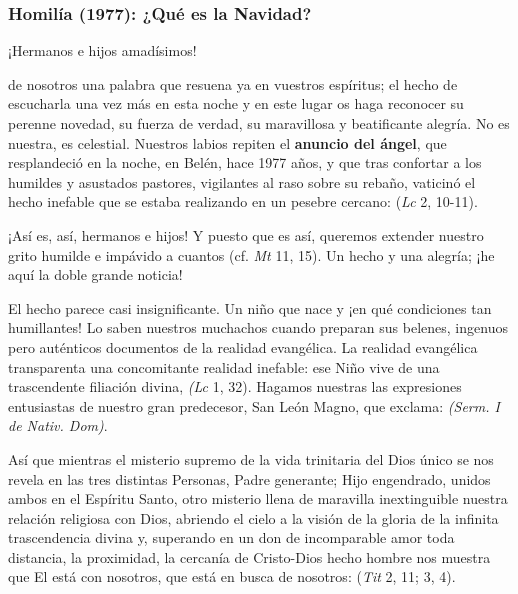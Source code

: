 \subsubsection{Homilía (1977): ¿Qué es la Navidad?}


\begin{body}
	¡Hermanos e hijos amadísimos!
	
	 de nosotros una palabra que resuena ya en vuestros espíritus; el hecho de escucharla una vez más en esta noche y en este lugar os haga reconocer su perenne novedad, su fuerza de verdad, su maravillosa y beatificante alegría. No es nuestra, es celestial. Nuestros labios repiten el \textbf{anuncio del ángel}, que resplandeció en la noche, en Belén, hace 1977 años, y que tras confortar a los humildes y asustados pastores, vigilantes al raso sobre su rebaño, vaticinó el hecho inefable que se estaba realizando en un pesebre cercano:  (\emph{Lc} 2, 10-11).
	
	¡Así es, así, hermanos e hijos! Y puesto que es así, queremos extender nuestro grito humilde e impávido a cuantos  (cf. \emph{Mt} 11, 15). Un hecho y una alegría; ¡he aquí la doble grande noticia!
	
	El hecho parece casi insignificante. Un niño que nace y ¡en qué condiciones tan humillantes! Lo saben nuestros muchachos cuando preparan sus belenes, ingenuos pero auténticos documentos de la realidad evangélica. La realidad evangélica transparenta una concomitante realidad inefable: ese Niño vive de una trascendente filiación divina,  \emph{(Lc} 1, 32). Hagamos nuestras las expresiones entusiastas de nuestro gran predecesor, San León Magno, que exclama:  \emph{(Serm. I de Nativ. Dom)}.
	
	Así que mientras el misterio supremo de la vida trinitaria del Dios único se nos revela en las tres distintas Personas, Padre generante; Hijo engendrado, unidos ambos en el Espíritu Santo, otro misterio llena de maravilla inextinguible nuestra relación religiosa con Dios, abriendo el cielo a la visión de la gloria de la infinita trascendencia divina y, superando en un don de incomparable amor toda distancia, la proximidad, la cercanía de Cristo-Dios hecho hombre nos muestra que El está con nosotros, que está en busca de nosotros:  (\emph{Tit} 2, 11; 3, 4).
	

\end{body}

